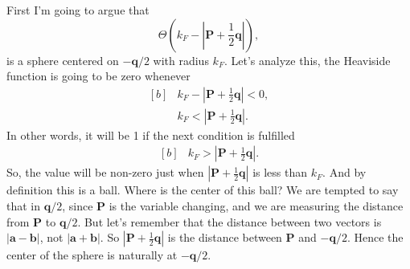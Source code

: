 \begin{questions}
\begin{solution}
  First I'm going to argue that
  \begin{equation*}
    \Theta(k_F - |\bm{P} +\frac{1}{2}\bm{q}|),
  \end{equation*}
  is a sphere centered on $-\bm{q}/2$ with radius $k_F$. Let's analyze this, the Heaviside function is going to be zero whenever
  \begin{equation*}
    \begin{aligned}[b]
      &k_F - |\bm{P} +\frac{1}{2}\bm{q}| < 0,\\
      &k_F  < |\bm{P} +\frac{1}{2}\bm{q}|.
    \end{aligned}
  \end{equation*}
In other words, it will be 1 if the next condition is fulfilled
\begin{equation*}
  \begin{aligned}[b]
    &k_F  > |\bm{P} +\frac{1}{2}\bm{q}|.
  \end{aligned}
\end{equation*}
So, the value will be non-zero just when $|\bm{P} +\frac{1}{2}\bm{q}|$ is less than $k_F$. And by definition this is a ball. Where is the center of this ball? We are tempted to say that in $\bm{q}/2$, since $\bm{P}$ is the variable changing, and we are measuring the distance from $\bm{P}$ to $\bm{q}/2$. But let's remember that the distance between two vectors is $|\bm{a} - \bm{b}|$, not $|\bm{a} + \bm{b}|$. So $|\bm{P} +\frac{1}{2}\bm{q}|$ is the distance between $\bm{P}$ and $-\bm{q}/2$. Hence the center of the sphere is naturally at $-\bm{q}/2$.


\end{solution}
\end{questions}
